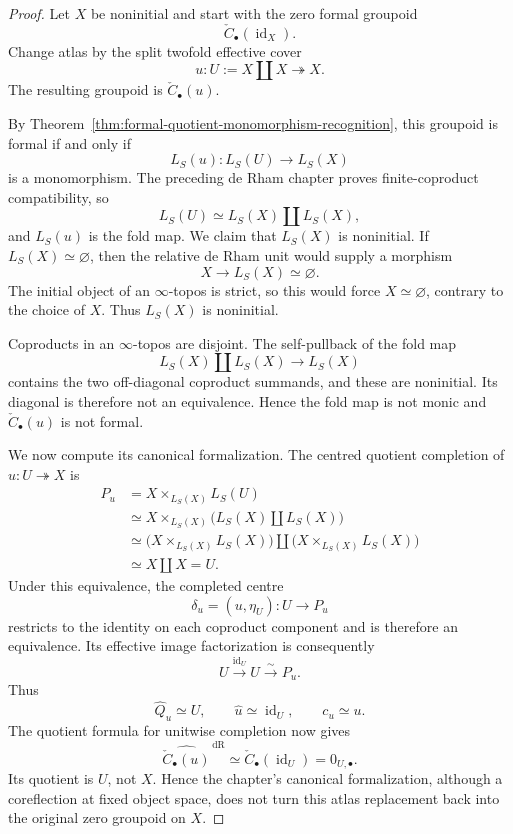 \begin{proof}
Let $X$ be noninitial and start with the zero formal groupoid
\[
    \check C_\bullet(\operatorname{id}_X).
\]
Change atlas by the split twofold effective cover
\[
    u:
    U:=X\amalg X
    \twoheadrightarrow
    X.
\]
The resulting groupoid is $\check C_\bullet(u)$.

By Theorem~\ref{thm:formal-quotient-monomorphism-recognition}, this groupoid is
formal if and only if
\[
    L_S(u):
    L_S(U)\longrightarrow L_S(X)
\]
is a monomorphism.  The preceding de Rham chapter proves finite-coproduct
compatibility, so
\[
    L_S(U)
    \simeq
    L_S(X)\amalg L_S(X),
\]
and $L_S(u)$ is the fold map.  We claim that $L_S(X)$ is noninitial.  If
$L_S(X)\simeq\varnothing$, then the relative de Rham unit would supply a
morphism
\[
    X\longrightarrow L_S(X)\simeq\varnothing.
\]
The initial object of an $\infty$-topos is strict, so this would force
$X\simeq\varnothing$, contrary to the choice of $X$.  Thus $L_S(X)$ is
noninitial.

Coproducts in an $\infty$-topos are disjoint.  The self-pullback of the fold
map
\[
    L_S(X)\amalg L_S(X)
    \longrightarrow
    L_S(X)
\]
contains the two off-diagonal coproduct summands, and these are noninitial.
Its diagonal is therefore not an equivalence.  Hence the fold map is not
monic and $\check C_\bullet(u)$ is not formal.

We now compute its canonical formalization.  The centred quotient completion
of $u:U\twoheadrightarrow X$ is
\[
\begin{aligned}
    P_u
    &=
    X\times_{L_S(X)}L_S(U)\\
    &\simeq
    X\times_{L_S(X)}
    \bigl(L_S(X)\amalg L_S(X)\bigr)\\
    &\simeq
    \bigl(X\times_{L_S(X)}L_S(X)\bigr)
    \amalg
    \bigl(X\times_{L_S(X)}L_S(X)\bigr)\\
    &\simeq
    X\amalg X
    =
    U.
\end{aligned}
\]
Under this equivalence, the completed centre
\[
    \delta_u=(u,\eta_U):U\longrightarrow P_u
\]
restricts to the identity on each coproduct component and is therefore an
equivalence.  Its effective image factorization is consequently
\[
    U
    \xrightarrow{\operatorname{id}_U}
    U
    \xrightarrow{\sim}
    P_u.
\]
Thus
\[
    \widehat Q_u\simeq U,
    \qquad
    \widehat u\simeq\operatorname{id}_U,
    \qquad
    c_u\simeq u.
\]
The quotient formula for unitwise completion now gives
\[
    \widehat{\check C_\bullet(u)}^{\,\mathrm{dR}}
    \simeq
    \check C_\bullet(\operatorname{id}_U)
    =
    0_{U,\bullet}.
\]
Its quotient is $U$, not $X$.  Hence the chapter's canonical formalization,
although a coreflection at fixed object space, does not turn this atlas
replacement back into the original zero groupoid on $X$.
\end{proof}

